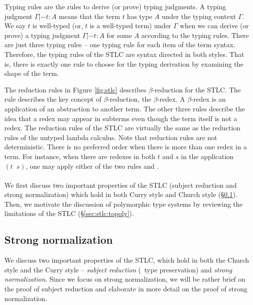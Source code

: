 Typing rules are the rules to derive (or prove) typing judgments.
A typing judgment $\Gamma |- t : A$ means that the term $t$ has type $A$
under the typing context $\Gamma$. We say $t$ is well-typed
(or, $t$ is a well-typed term) under $\Gamma$ when we can derive (or prove)
a typing judgment $\Gamma |- t : A$ for some $A$ according to the typing rules.
There are just three typing rules --
one typing rule for each item of the term syntax.
Therefore, the typing rules of the STLC are syntax directed in both styles.
That is, there is exactly one rule to choose for the typing derivation
by examining the shape of the term.
 
The reduction rules in Figure \ref{fig:stlc} describes $\beta$-reduction
for the STLC. The  rule describes the key concept
of $\beta$-reduction, the $\beta$-redex. A $\beta$-redex is an application
of an abstraction to another term. The other three rules describe the idea
that a redex may appear in subterms even though the term itself is not a redex.
The reduction rules of the STLC are virtually the same as the reduction rules
of the untyped lambda calculus. Note that reduction rules
are not deterministic. There is no preferred order when there is more than one
redex in a term. For instance, when there are redexes in both $t$ and $s$
in the application $(t\;\;s)$, one may apply either of the two rules
 and .

\paragraph{}
We first discuss two important properties of the STLC
(subject reduction and strong normalization) which hold
in both Curry style and Church style (\S\ref{sec:stlc:srsn}).
Then, we motivate the discussion of polymorphic type systems
by reviewing the limitations of the STLC (\S\ref{sec:stlc:topoly}).

\subsection{Strong normalization}\label{sec:stlc:srsn}
We discuss two important properties of the STLC, which hold in both
the Church style and the Curry style -- \emph{subject reduction} (\aka\
type preservation) and \emph{strong normalization}.
Since we focus on strong normalization, we will be rather brief on
the proof of subject reduction and elaborate in more detail on
the proof of strong normalization.
 
